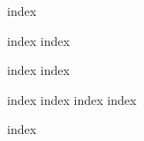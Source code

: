 \documentclass{article}
\begin{document}
{index}


{index}
{index}

{index}
{index}

{index}
{index}
{index}
{index}

{index}
\end{document}
